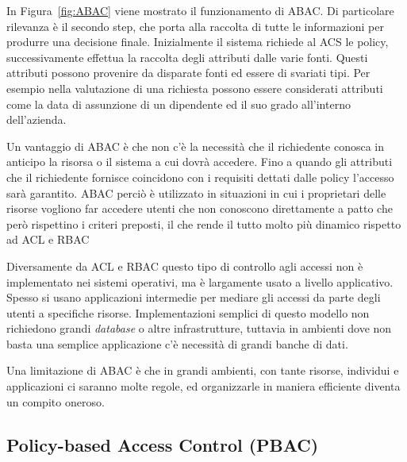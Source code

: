 In Figura~\ref{fig:ABAC} viene mostrato il funzionamento di \ac{ABAC}. Di particolare rilevanza è il secondo step, che porta alla raccolta di tutte le informazioni per produrre una decisione finale.
Inizialmente il sistema richiede al \ac{ACS} le policy, successivamente effettua la raccolta degli attributi dalle varie fonti.
Questi attributi possono provenire da disparate fonti ed essere di svariati tipi. Per esempio nella valutazione di una richiesta possono essere considerati attributi come la data di assunzione di un dipendente ed il suo grado all'interno dell'azienda. 


Un vantaggio di \ac{ABAC} è che non c'è la necessità che il richiedente conosca in anticipo
la risorsa o il sistema a cui dovrà accedere. Fino a quando gli attributi che il richiedente fornisce 
coincidono con i requisiti dettati dalle policy l'accesso sarà garantito. \ac{ABAC} perciò è utilizzato in situazioni in 
cui i proprietari delle risorse vogliono far accedere utenti che non conoscono direttamente a patto che però rispettino i criteri preposti, il che rende il tutto molto più dinamico rispetto ad \ac{ACL} e \ac{RBAC} \par
Diversamente da \ac{ACL} e \ac{RBAC} questo tipo di controllo agli 
accessi non è implementato nei sistemi operativi, ma è largamente usato a livello applicativo.
Spesso si usano applicazioni intermedie per mediare gli accessi da parte degli utenti a specifiche risorse.
Implementazioni semplici di questo modello non richiedono grandi \textit{database} o altre infrastrutture, tuttavia in ambienti dove non basta una semplice applicazione c'è necessità di grandi banche di dati.\par
Una limitazione di \ac{ABAC} è che in grandi ambienti, con tante risorse, individui e applicazioni ci saranno molte regole, ed organizzarle in maniera efficiente diventa un compito oneroso.


\subsection*{Policy-based Access Control (PBAC)} %
\label{sub:policy_based_access_control_}

